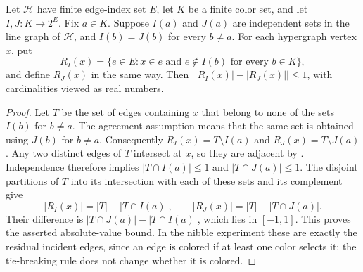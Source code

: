 \begin{lemma}
Let $\mathcal H$ have finite edge-index set $E$, let $K$ be a finite
color set, and let $I,J:K\to 2^E$. Fix $a\in K$. Suppose $I(a)$ and
$J(a)$ are independent sets in the line graph of $\mathcal H$, and
$I(b)=J(b)$ for every $b\ne a$. For each hypergraph vertex $x$, put
\[
R_I(x)=\{e\in E:x\in e\text{ and }e\notin I(b)\text{ for every }b\in K\},
\]
and define $R_J(x)$ in the same way. Then
$\bigl||R_I(x)|-|R_J(x)|\bigr|\le1$, with cardinalities viewed as real numbers.
\end{lemma}
\begin{proof}
Let $T$ be the set of edges containing $x$ that belong to none of the
sets $I(b)$ for $b\ne a$. The agreement assumption means that the same
set is obtained using $J(b)$ for $b\ne a$. Consequently
$R_I(x)=T\setminus I(a)$ and $R_J(x)=T\setminus J(a)$.
Any two distinct edges of $T$ intersect at $x$, so they are adjacent
by . Independence therefore implies
$|T\cap I(a)|\le1$ and $|T\cap J(a)|\le1$.
The disjoint partitions of $T$ into its intersection with each of these
sets and its complement give
\[
|R_I(x)|=|T|-|T\cap I(a)|,\qquad
|R_J(x)|=|T|-|T\cap J(a)|.
\]
Their difference is $|T\cap J(a)|-|T\cap I(a)|$, which lies in
$[-1,1]$. This proves the asserted absolute-value bound. In the nibble
experiment these are exactly the residual incident edges, since an edge
is colored if at least one color selects it; the tie-breaking rule does
not change whether it is colored.
\end{proof}
